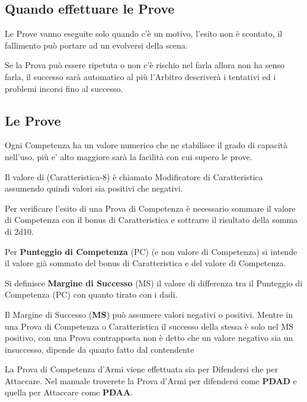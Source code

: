 \documentclass[12pt,a4paper,twoside,openany]{book}
\begin{document}
\begin{multicols}{2}
	

\subsection{Quando effettuare le Prove}

Le Prove vanno eseguite solo quando c'è un motivo, l'esito non è scontato, il fallimento può portare ad un evolversi della scena.

Se la Prova può essere ripetuta o non c'è rischio nel farla allora non ha senso farla, il successo sarà automatico al più l'Arbitro descriverà i tentativi ed i problemi incorsi fino al successo.

\subsection{Le Prove}

Ogni Competenza ha un valore numerico che ne stabilisce il grado di capacità nell'uso, più e' alto maggiore sarà la facilità con cui supero le prove.

Il valore di (Caratteristica-8) è chiamato Modificatore di Caratteristica assumendo quindi valori sia positivi che negativi.

Per verificare l'esito di una Prova di Competenza è necessario sommare il valore di Competenza con il bonus di Caratteristica e sottrarre il risultato della somma di 2d10.

Per \textbf{Punteggio di Competenza} (PC) (e non valore di Competenza) si intende il valore già sommato del bonus di Caratteristica e del valore di Competenza.

Si definisce \textbf{Margine di Successo} (MS) il valore di differenza tra il Punteggio di Competenza (PC) con quanto tirato con i dadi.

Il Margine di Successo (\textbf{MS}) può assumere valori negativi o positivi. Mentre in una Prova di Competenza o Caratteristica il successo della stessa è solo nel MS positivo, con una Prova contrapposta non è detto che un valore negativo sia un insuccesso, dipende da quanto fatto dal contendente

La Prova di Competenza d'Armi viene effettuata sia per Difendersi che per Attaccare. Nel manuale troverete la Prova d'Armi per difendersi come \textbf{PDAD} e quella per Attaccare come \textbf{PDAA}.
 

\end{multicols}
\end{document}
